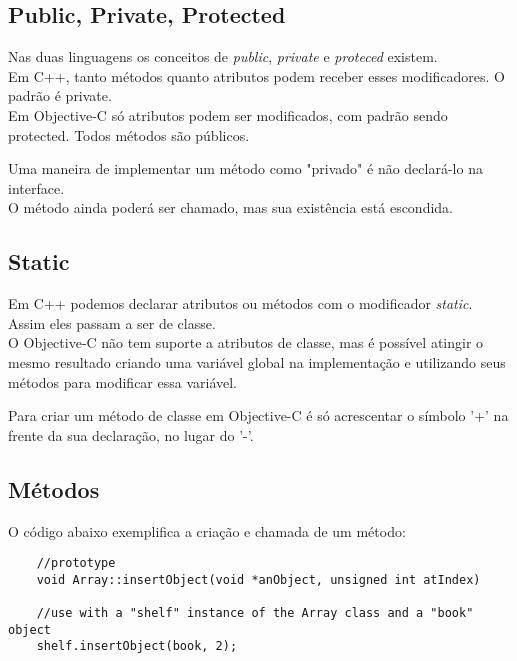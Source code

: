 \documentclass[brazil]{beamer}
\begin{document}
\subsection{Public, Private, Protected}

\begin{frame}
  Nas duas linguagens os conceitos de \textit{public}, \textit{private} e \textit{proteced} existem. \\
  Em C++, tanto métodos quanto atributos podem receber esses modificadores. O padrão é private. \\
  Em Objective-C só atributos podem ser modificados, com padrão sendo protected. Todos métodos são públicos.
\end{frame}

\begin{frame}
  Uma maneira de implementar um método como "privado" é não declará-lo na interface. \\
  O método ainda poderá ser chamado, mas sua existência está escondida.
\end{frame}

\subsection{Static}

\begin{frame}
  Em C++ podemos declarar atributos ou métodos com o modificador \textit{static}. Assim eles passam a ser de classe. \\
  O Objective-C não tem suporte a atributos de classe, mas é possível atingir o mesmo resultado criando uma variável global 
  na implementação e utilizando seus métodos para modificar essa variável.
\end{frame}

\begin{frame}
  Para criar um método de classe em Objective-C é só acrescentar o símbolo '+' na frente da sua declaração, no lugar do '-'.
\end{frame}

\subsection{Métodos}

\begin{frame}[fragile]
  O código abaixo exemplifica a criação e chamada de um método:
  \lstset{language=C++,basicstyle=\tiny}
  \begin{lstlisting}
    //prototype
    void Array::insertObject(void *anObject, unsigned int atIndex)
    
    //use with a "shelf" instance of the Array class and a "book" object
    shelf.insertObject(book, 2);
  \end{lstlisting}
\end{frame}
\end{document}
